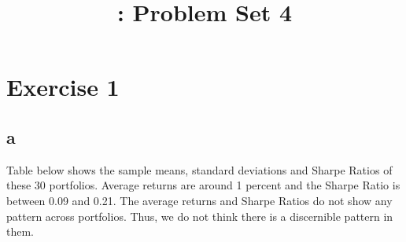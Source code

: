 \documentclass{report}
\title{\LectureTitle: Problem Set 4}
\begin{document}
\maketitle
\newpage

\section{Exercise 1}

\subsection{a}
Table below shows the sample means, standard deviations and Sharpe Ratios of these 30 portfolios. Average returns are around 1 percent and the Sharpe Ratio is between 0.09 and 0.21. The average returns and Sharpe Ratios do not show any pattern across portfolios. Thus, we do not think there is a discernible pattern in them.
\end{document}
